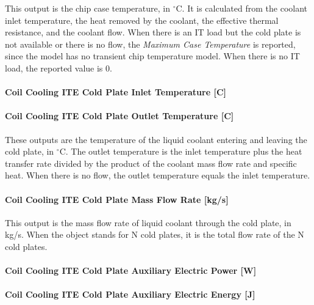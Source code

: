 This output is the chip case temperature, in $^\circ$C. It is calculated from the coolant inlet temperature, the heat removed by the coolant, the effective thermal resistance, and the coolant flow. When there is an IT load but the cold plate is not available or there is no flow, the \emph{Maximum Case Temperature} is reported, since the model has no transient chip temperature model. When there is no IT load, the reported value is 0.

\paragraph{Coil Cooling ITE Cold Plate Inlet Temperature {[}C{]}}\label{coil-cooling-ite-cold-plate-inlet-temperature-c}

\paragraph{Coil Cooling ITE Cold Plate Outlet Temperature {[}C{]}}\label{coil-cooling-ite-cold-plate-outlet-temperature-c}

These outputs are the temperature of the liquid coolant entering and leaving the cold plate, in $^\circ$C. The outlet temperature is the inlet temperature plus the heat transfer rate divided by the product of the coolant mass flow rate and specific heat. When there is no flow, the outlet temperature equals the inlet temperature.

\paragraph{Coil Cooling ITE Cold Plate Mass Flow Rate {[}kg/s{]}}\label{coil-cooling-ite-cold-plate-mass-flow-rate-kgs}

This output is the mass flow rate of liquid coolant through the cold plate, in kg/s. When the object stands for N cold plates, it is the total flow rate of the N cold plates.

\paragraph{Coil Cooling ITE Cold Plate Auxiliary Electric Power {[}W{]}}\label{coil-cooling-ite-cold-plate-auxiliary-electric-power-w}

\paragraph{Coil Cooling ITE Cold Plate Auxiliary Electric Energy {[}J{]}}\label{coil-cooling-ite-cold-plate-auxiliary-electric-energy-j}

